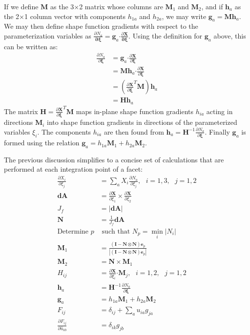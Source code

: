 If we define ${\bm {M}}$ as the 3$\times$2 matrix whose columns are ${\bm {M}}_1$ and ${\bm M}_2$, and if $\bm{h}_a$ as the 2$\times$1 column vector with components $h_{1a}$ and $h_{2a}$, we may write ${\bm g}_a = {\bm M}{\bm h}_a$. We may then define shape function gradients with respect to the parameterization variables as $\frac{\partial N_a}{\bm{\partial {\xi}}} = {\bm g}_a \bm{\cdot} \frac{\partial {\bm X}}{\bm{\partial {\xi}}}$. Using the definition for ${\bm g}_a$ above, this can be written as:
\begin{align}
\frac{\partial N_a}{\partial {\bm \xi}} &= {\bm g}_a \bm{\cdot} \frac{\partial {\bm X}}{\partial {\bm \xi}} \\
&= {\bm M}{\bm h}_a \bm{\cdot} \frac{\partial {\bm X}}{\partial {\bm \xi}} \\
&= (\frac{\partial {\bm X}}{\partial {\bm \xi}}^T{\bm M}){\bm h}_a \\
&= {\bm H}{\bm h}_a
\end{align}
The matrix ${\bm H} = \frac{\partial {\bm X}}{\partial {\bm \xi}}^T{\bm M}$ maps in-plane shape function gradients $h_{ia}$ acting in directions ${\bm M}_i$ into shape function gradients in directions of the parameterized variables ${\xi_i}$. The components $h_{ia}$ are then found from ${\bm h}_a = {\bm H}^{-1}\frac{\partial N_a}{\partial {\bm \xi}}$. Finally ${\bm g}_a$ is formed using the relation ${\bm g}_a = {h_{1a}}{\bm M}_1 + {h_{2a}}{\bm M}_2$.

The previous discussion simplifies to a concise set of calculations that are performed at each integration point of a facet:
\begin{align}
\frac{\partial X_{i}}{\partial \xi_j} &= \sum_a X_{i}\frac{\partial N_a}{\partial \xi_j}, \text{\ \ \ \ }i=1,3, \text{\ \ }j = 1,2 \\
{\bm{dA}} &= \frac{\partial{\bm{X}}}{\partial \xi_1} \times \frac{\partial {\bm {X}}}{\partial \xi_2} \\
J_f &= | {\bm {dA}}| \\
{\bm N} &= \frac{1}{J_f}{\bm {dA}} \\
\text{Determine } p &\text{ such that } N_p = \min_i{|N_i|} \\
{\bm M}_1 &=\frac{ ({\bm I} - {\bm N}\otimes{\bm N}){\bm e}_p}{|({\bm I} - {\bm N}\otimes{\bm N}){\bm e}_p|} \\
{\bm M}_2 &= {\bm N} \times {\bm M}_1 \\
H_{ij} &= \frac{\partial {\bm X}}{\partial \xi_i} \bm{\cdot} {\bm M}_j, \text{\ \ \ \ }i=1,\text{2}, \text{\ \ }j = 1,\text{2} \\
{\bm h}_a &= {\bm H}^{-1} \frac{\partial N_a}{\partial {\bm \xi}} \\
{\bm g}_a &= h_{1a}{\bm M}_1 + h_{2a}{\bm M}_2 \\
F_{ij} &= \delta_{ij} + \sum_a{u_{ia}g_{ja}} \\
\frac{\partial F_{ij}}{\partial \hat{u}_{kb}} &= \delta_{ik}g_{jb}
\end{align}

